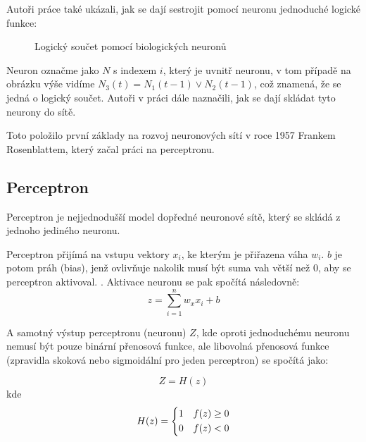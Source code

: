 \documentclass[FM,BP,fonts]{tulthesis}
\begin{document}
Autoři práce také ukázali, jak se dají sestrojit pomocí neuronu jednoduché logické funkce: 

\begin{figure}[htbp]
	\centering
	\caption{Logický součet pomocí biologických neuronů}
	\label{fig:logic_or}
\end{figure}

Neuron označme jako $N$ s indexem $i$, který je uvnitř neuronu, v tom případě na obrázku výše vidíme $N_3(t) = N_1(t-1) \vee N_2(t-1)$, což znamená, že se jedná o logický součet. \cite{mcculloch1943logical} Autoři v práci dále naznačili, jak se dají skládat tyto neurony do sítě. 

Toto položilo první základy na rozvoj neuronových sítí v roce 1957 Frankem Rosenblattem, který začal práci na perceptronu.
\newpage
\subsection{Perceptron}
Perceptron je nejjednodušší model dopředné neuronové sítě, který se skládá z jednoho jediného neuronu.

Perceptron přijímá na vstupu vektory $x_i$, ke kterým je přiřazena váha $w_i$. $b$ je potom práh (bias), jenž ovlivňuje nakolik musí být suma vah větší než 0, aby se perceptron aktivoval. \cite{martinpilatNN}. Aktivace neuronu se pak spočítá následovně:
\label{eq:activation_percep}
\begin{equation}
	z = \sum_{i=1}^{n} w_xx_i + b
\end{equation}

A samotný výstup perceptronu (neuronu) $Z$, kde oproti jednoduchému neuronu nemusí být pouze binární přenosová funkce, ale libovolná přenosová funkce (zpravidla skoková nebo sigmoidální pro jeden perceptron) \cite{martinpilatNN} se spočítá jako:

\begin{equation}
	Z = H(z)
\end{equation}
kde
\begin{equation}
	H(z) = \begin{dcases}
		1 & f(z) \geq 0 \\
		0 & f(z) < 0
	\end{dcases}
\end{equation}
\end{document}
